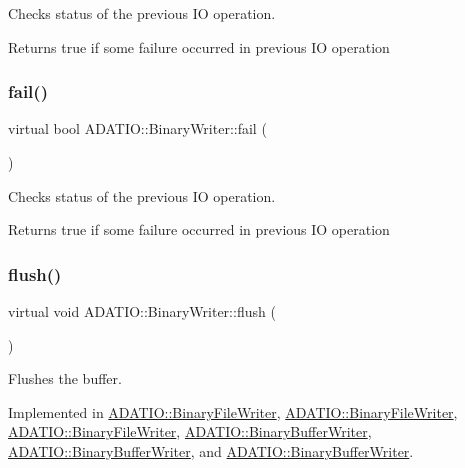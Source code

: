 Checks status of the previous IO operation. 

\begin{DoxyReturn}{Returns}
true if some failure occurred in previous IO operation 
\end{DoxyReturn}
\mbox{\label{classADATIO_1_1BinaryWriter_af549adfdbe2c671008ad58952b34b06e}} 
\subsubsection{\texorpdfstring{fail()}{fail()}\hspace{0.1cm}{\footnotesize\ttfamily [3/3]}}
{\footnotesize\ttfamily virtual bool A\+D\+A\+T\+I\+O\+::\+Binary\+Writer\+::fail (\begin{DoxyParamCaption}{ }\end{DoxyParamCaption})\hspace{0.3cm}{\ttfamily [virtual]}}



Checks status of the previous IO operation. 

\begin{DoxyReturn}{Returns}
true if some failure occurred in previous IO operation 
\end{DoxyReturn}
\mbox{\label{classADATIO_1_1BinaryWriter_a1d335eeed64094b8641f3ebf731c981e}} 
\subsubsection{\texorpdfstring{flush()}{flush()}\hspace{0.1cm}{\footnotesize\ttfamily [1/3]}}
{\footnotesize\ttfamily virtual void A\+D\+A\+T\+I\+O\+::\+Binary\+Writer\+::flush (\begin{DoxyParamCaption}{ }\end{DoxyParamCaption})\hspace{0.3cm}{\ttfamily [pure virtual]}}



Flushes the buffer. 



Implemented in \mbox{\hyperlink{classADATIO_1_1BinaryFileWriter_ad914b901c6386a2ad7b2c8cf9bddfa9b}{A\+D\+A\+T\+I\+O\+::\+Binary\+File\+Writer}}, \mbox{\hyperlink{classADATIO_1_1BinaryFileWriter_ad914b901c6386a2ad7b2c8cf9bddfa9b}{A\+D\+A\+T\+I\+O\+::\+Binary\+File\+Writer}}, \mbox{\hyperlink{classADATIO_1_1BinaryFileWriter_ad914b901c6386a2ad7b2c8cf9bddfa9b}{A\+D\+A\+T\+I\+O\+::\+Binary\+File\+Writer}}, \mbox{\hyperlink{classADATIO_1_1BinaryBufferWriter_accc3319508a804b054d21b6bddeef85d}{A\+D\+A\+T\+I\+O\+::\+Binary\+Buffer\+Writer}}, \mbox{\hyperlink{classADATIO_1_1BinaryBufferWriter_accc3319508a804b054d21b6bddeef85d}{A\+D\+A\+T\+I\+O\+::\+Binary\+Buffer\+Writer}}, and \mbox{\hyperlink{classADATIO_1_1BinaryBufferWriter_accc3319508a804b054d21b6bddeef85d}{A\+D\+A\+T\+I\+O\+::\+Binary\+Buffer\+Writer}}.

